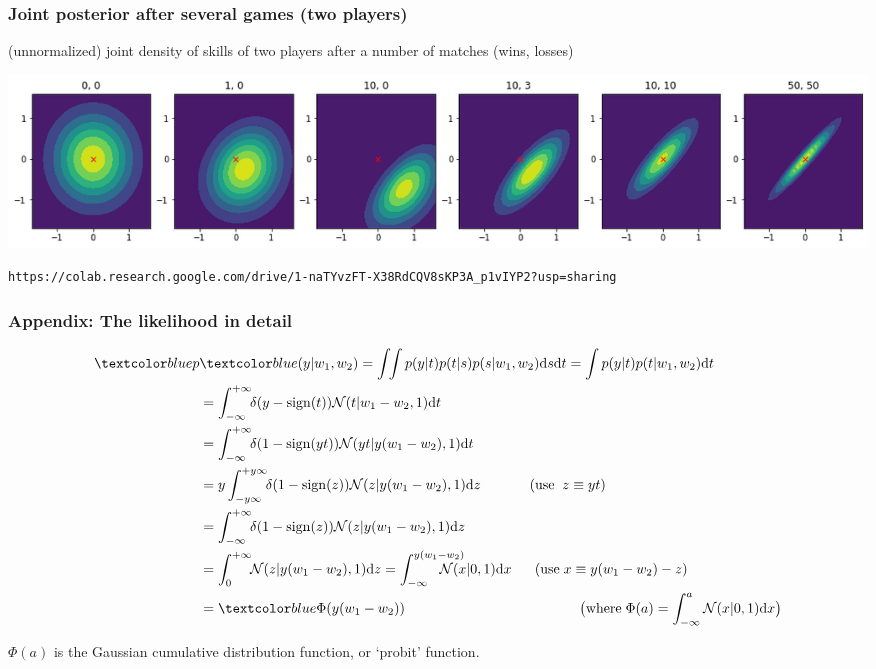 \begin{frame}
\frametitle{Joint posterior after several games (two players)}

(unnormalized) joint density of skills of two players after a number of matches (wins, losses)

\centerline{\includegraphics[width=\textwidth]{davids_trueskill_plot}}

\texttt{https://colab.research.google.com/drive/1-naTYvzFT-X38RdCQV8sKP3A_p1vIYP2?usp=sharing}
\end{frame}



\begin{frame}
\frametitle{Appendix: The likelihood in detail}

\begin{align*}
\Blue{p}&\Blue{(y|w_1,w_2)} = \int\!\!\int p(y|t)p(t|s)p(s|w_1,w_2)\mathrm{d}s\mathrm{d}t
= \int p(y|t)p(t|w_1,w_2)\mathrm{d}t\\
&= \int_{-\infty}^{+\infty}\!\! \delta(y-\operatorname{sign}(t))\N(t| w_1-w_2, 1
)\mathrm{d}t\\
&= \int_{-\infty}^{+\infty}\!\! \delta(1-\operatorname{sign}(y t))\N(y t| y(w_1-
w_2), 1)\mathrm{d}t\\
&= y \int_{-y\infty}^{+y\infty}\!\! \delta(1-\operatorname{sign}(z))\N(z| y(w_1-
w_2), 1)\mathrm{d}z
\;\;\;\;\;\;\;\;\;\;\;\;\, (\mathrm{use}\;\; z\equiv yt)\\
&= \int_{-\infty}^{+\infty}\!\! \delta(1-\operatorname{sign}(z))\N(z| y(w_1-w_2)
, 1)\mathrm{d}z\\
&= \int_{0}^{+\infty}\!\! \N(z| y(w_1-w_2), 1)\mathrm{d}z
= \int_{-\infty}^{y(w_1-w_2)} \!\!\!\!\!\!\!\!\!\!\!\!\N(x| 0, 1)\mathrm{d}x
\;\;\;\;\;\; (\mathrm{use}\; x\equiv y(w_1-w_2)-z)\\
&= \Blue{\Phi(y(w_1-w_2))}
\;\;\;\;\;\;\;\;\;\;\;\;\;\;\; 
\;\;\;\;\;\;\;\;\;\;\;\;\;\;\; 
\;\;\;\;\;\;\;\;\;\;\;\;\;\;\; 
\big(\mathrm{where}\; \Phi(a)=\int_{-\infty}^a \N(x| 0, 1)\mathrm{d}x\big)
\end{align*}

$\Phi(a)$ is the Gaussian cumulative distribution function, or `probit' function.

\end{frame}


